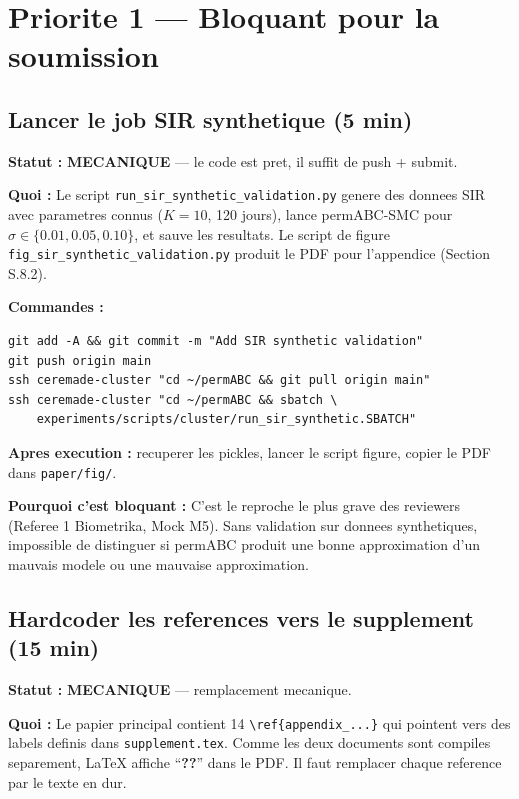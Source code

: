 \documentclass[11pt]{article}
\newcommand{\mech}{\textcolor{mech}{\textbf{MECANIQUE}}}
\begin{document}
\section{Priorite 1 --- Bloquant pour la soumission}

\subsection{Lancer le job SIR synthetique (5 min)}
\label{sec:sir_synth}

\textbf{Statut :} \mech{} --- le code est pret, il suffit de push + submit.

\textbf{Quoi :} Le script \texttt{run\_sir\_synthetic\_validation.py} genere des donnees SIR avec parametres connus ($K=10$, 120 jours), lance permABC-SMC pour $\sigma \in \{0.01, 0.05, 0.10\}$, et sauve les resultats. Le script de figure \texttt{fig\_sir\_synthetic\_validation.py} produit le PDF pour l'appendice (Section S.8.2).

\textbf{Commandes :}
\begin{verbatim}
git add -A && git commit -m "Add SIR synthetic validation"
git push origin main
ssh ceremade-cluster "cd ~/permABC && git pull origin main"
ssh ceremade-cluster "cd ~/permABC && sbatch \
    experiments/scripts/cluster/run_sir_synthetic.SBATCH"
\end{verbatim}

\textbf{Apres execution :} recuperer les pickles, lancer le script figure, copier le PDF dans \texttt{paper/fig/}.

\textbf{Pourquoi c'est bloquant :} C'est le reproche le plus grave des reviewers (Referee 1 Biometrika, Mock M5). Sans validation sur donnees synthetiques, impossible de distinguer si permABC produit une bonne approximation d'un mauvais modele ou une mauvaise approximation.

\subsection{Hardcoder les references vers le supplement (15 min)}
\label{sec:refs}

\textbf{Statut :} \mech{} --- remplacement mecanique.

\textbf{Quoi :} Le papier principal contient 14 \verb|\ref{appendix_...}| qui pointent vers des labels definis dans \texttt{supplement.tex}. Comme les deux documents sont compiles separement, LaTeX affiche ``\textbf{??}'' dans le PDF. Il faut remplacer chaque reference par le texte en dur.
\end{document}
